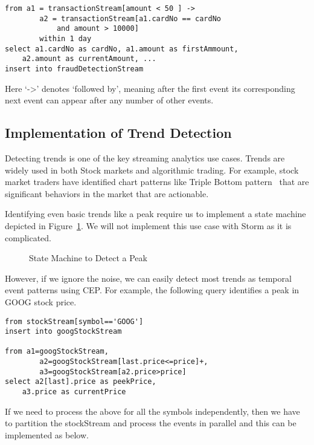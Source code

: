 \documentclass{sig-alternate}
\begin{document}
{\begin{lstlisting}[mathescape, showstringspaces=false]
from a1 = transactionStream[amount < 50 ] -> 
        a2 = transactionStream[a1.cardNo == cardNo 
        	and amount > 10000]
        within 1 day
select a1.cardNo as cardNo, a1.amount as firstAmmount, 
	a2.amount as currentAmount, ...
insert into fraudDetectionStream
\end{lstlisting} 

Here `->' denotes `followed by', meaning after the first event its corresponding next event can appear after any number of other events. 


\subsection{Implementation of Trend Detection}

Detecting trends is one of the key streaming analytics use cases. Trends are widely used in both Stock markets and algorithmic trading. For example, stock market traders have identified chart patterns like Triple Bottom pattern~\cite{bulkowski2011encyclopedia} that are significant behaviors in the market that are actionable. 

Identifying even basic trends like a peak require us to implement a state machine depicted in Figure~\ref{fig:q4}. We will not implement this use case with Storm as it is complicated. 

\begin{figure}[!htbp]
\centering
{}
\caption{State Machine to Detect a Peak}
\label{fig:q4}
\end{figure}

However, if we ignore the noise, we can easily detect most trends as temporal event patterns using CEP. For example, the following query identifies a peak in GOOG stock price. 


\begin{lstlisting}[mathescape, showstringspaces=false]
from stockStream[symbol=='GOOG'] 
insert into googStockStream

from a1=googStockStream, 
        a2=googStockStream[last.price<=price]+,
        a3=googStockStream[a2.price>price]
select a2[last].price as peekPrice, 
	a3.price as currentPrice
\end{lstlisting} 

If we need to process the above for all the symbols independently, then we have to partition the stockStream and process the events in parallel and this can be implemented as below.

}
\end{document}
